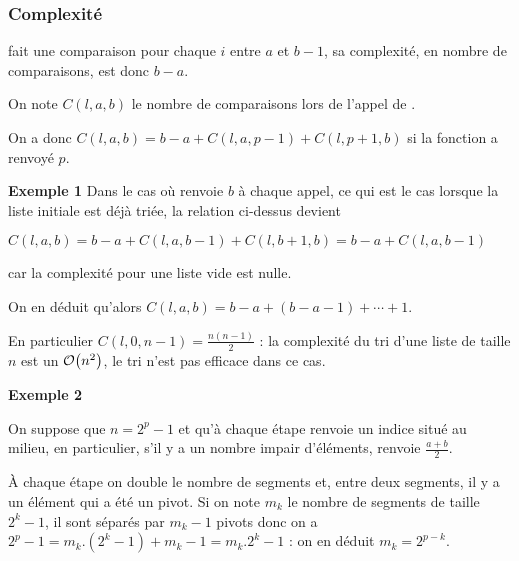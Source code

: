 \subsubsection{Complexité}
 fait une comparaison pour chaque $i$ entre $a$ et $b-1$, sa complexité, en nombre de comparaisons, est donc $b-a$.

On note $C(l,a,b)$ le nombre de comparaisons lors de l'appel de .

On a donc $C(l,a,b) = b-a+C(l,a,p-1)+C(l,p+1,b)$ si la fonction  a renvoyé $p$.

\medskip

{\bf Exemple 1} Dans le cas où  renvoie $b$ à chaque appel, ce qui est le cas lorsque la liste initiale est déjà triée,  la relation ci-dessus devient

$C(l,a,b) = b-a+C(l,a,b-1)+C(l,b+1,b)= b-a+C(l,a,b-1)$ 

car la complexité pour une liste vide est nulle.

On en déduit qu'alors $C(l,a,b) = b-a+(b-a-1) +\cdots+1$.

En particulier $C(l,0,n-1) = \frac{n(n-1)}2$ : la complexité du tri d'une liste de taille $n$ est un ${\cal O}\bigl(n^2\bigr)$, le tri n'est pas efficace dans ce cas.

\medskip 

{\bf Exemple 2} 

On suppose que $n=2^p-1$ et qu'à chaque étape  renvoie un indice situé au milieu, en particulier, s'il y a un nombre impair d'éléments,  renvoie $\frac{a+b}2$.

\begin{center}
\end{center}
À chaque étape on double le nombre de segments et, entre deux segments, il y a un élément qui a été un pivot. Si on note $m_k$ le nombre de segments de taille $2^k-1$, il sont séparés par $m_k-1$ pivots donc on a $2^p-1 = m_k.(2^k-1)+m_k-1 = m_k.2^k - 1$ : on en déduit $m_k=2^{p-k}$.

